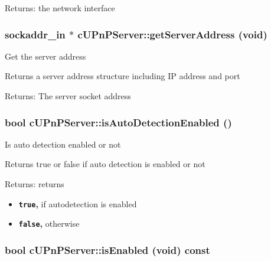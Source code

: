 \begin{Desc}
\item[Returns:]the network interface \end{Desc}
\hypertarget{classcUPnPServer_f938922eff48ca1035e88677e095c0c4}{
\subsubsection[{getServerAddress}]{\setlength{\rightskip}{0pt plus 5cm}sockaddr\_\-in $\ast$ cUPnPServer::getServerAddress (void)}}
\label{classcUPnPServer_f938922eff48ca1035e88677e095c0c4}


Get the server address

Returns a server address structure including IP address and port

\begin{Desc}
\item[Returns:]The server socket address \end{Desc}
\hypertarget{classcUPnPServer_389ffe474f61ec18b6f99dd02a9c31e4}{
\subsubsection[{isAutoDetectionEnabled}]{\setlength{\rightskip}{0pt plus 5cm}bool cUPnPServer::isAutoDetectionEnabled ()}}
\label{classcUPnPServer_389ffe474f61ec18b6f99dd02a9c31e4}


Is auto detection enabled or not

Returns true or false if auto detection is enabled or not

\begin{Desc}
\item[Returns:]returns\begin{itemize}
\item {\bf {\tt true},} if autodetection is enabled\item {\bf {\tt false},} otherwise \end{itemize}
\end{Desc}
\hypertarget{classcUPnPServer_fbaaebd4496e98106c2d9be4c2512a66}{
\subsubsection[{isEnabled}]{\setlength{\rightskip}{0pt plus 5cm}bool cUPnPServer::isEnabled (void) const}}
\label{classcUPnPServer_fbaaebd4496e98106c2d9be4c2512a66}



